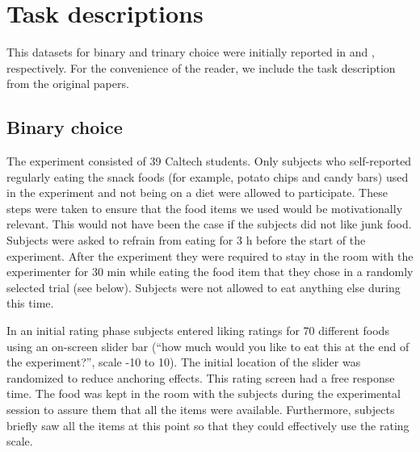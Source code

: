 

\newcommand{\nextbest}{\max_{i \neq c} \mu_t^{(i)}}
\newcommand{\postmean}{\mu_{t+1}^{(c)}}
\newcommand{\currentmean}{\mu_{t}^{(c)}}
\newcommand{\currentlam}{\lambda_{t}^{(c)}}
\newcommand{\voiCDF}{\Phi \left( \frac{a - \mu_\mu}{\sigma_\mu} \right)}
\newcommand{\conditionalx}{x_t \mid \currentmean, \currentlam}



\section{Task descriptions}\label{app:attention-task}

This datasets for binary and trinary choice were initially reported in \citet{krajbich2010visual} and \citet{krajbich2011multialternative}, respectively. For the convenience of the reader, we include the task description from the original papers.

\subsection{Binary choice}

The experiment consisted of 39 Caltech students. Only subjects who self-reported regularly eating the snack foods (for example, potato chips and candy bars) used in the experiment and not being on a diet were allowed to participate. These steps were taken to ensure that the food items we used would be motivationally relevant. This would not have been the case if the subjects did not like junk food. Subjects were asked to refrain from eating for 3 h before the start of the experiment. After the experiment they were required to stay in the room with the experimenter for 30 min while eating the food item that they chose in a randomly selected trial (see below). Subjects were not allowed to eat anything else during this time.

In an initial rating phase subjects entered liking ratings for 70 different foods using an on-screen slider bar (“how much would you like to eat this at the end of the experiment?”, scale -10 to 10). The initial location of the slider was randomized to reduce anchoring effects. This rating screen had a free response time. The food was kept in the room with the subjects during the experimental session to assure them that all the items were available. Furthermore, subjects briefly saw all the items at this point so that they could effectively use the rating scale.

